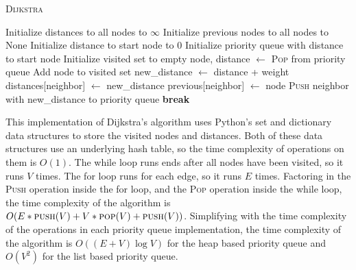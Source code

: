 \documentclass[12pt]{article}
\begin{document}
\begin{algorithm}[H]
    \caption{\textsc{Dijkstra}}
    \begin{algorithmic}[1]
        \State Initialize distances to all nodes to $\infty$ 
        \State Initialize previous nodes to all nodes to None 
        \State Initialize distance to start node to 0
        \State Initialize priority queue with distance to start node 
        \State Initialize visited set to empty
         
            \State node, distance $\gets$ \textsc{Pop} from priority queue 
            \State Add node to visited set
             
                    \State new\_distance $\gets$ distance + weight
                        \State distances[neighbor] $\gets$ new\_distance
                        \State previous[neighbor] $\gets$ node
                        \State \textsc{Push} neighbor with new\_distance to priority queue 
                    \EndIf
                \EndIf
            \EndFor
                \State \textbf{break}
            \EndIf
        \EndWhile

    \end{algorithmic}
\end{algorithm}

This implementation of Dijkstra's algorithm uses Python's set and dictionary data
structures to store the visited nodes and distances. Both of these data structures
use an underlying hash table, so the time complexity of operations on them is
$O(1)$. The while loop runs ends after all nodes have been visited, so it runs
$V$ times. The for loop runs for each edge, so it runs $E$ times. Factoring in
the \textsc{Push} operation inside the for loop, and the \textsc{Pop} operation
inside the while loop, the time complexity of the algorithm is $O(E * \textsc{push}(V)
 + V * \textsc{pop}(V) + \textsc{push}(V))$. Simplifying with the time complexity
of the operations in each priority queue implementation, the time complexity of
the algorithm is $O((E+V)\log V)$ for the heap based priority queue and $O(V^2)$
for the list based priority queue.
\end{document}
